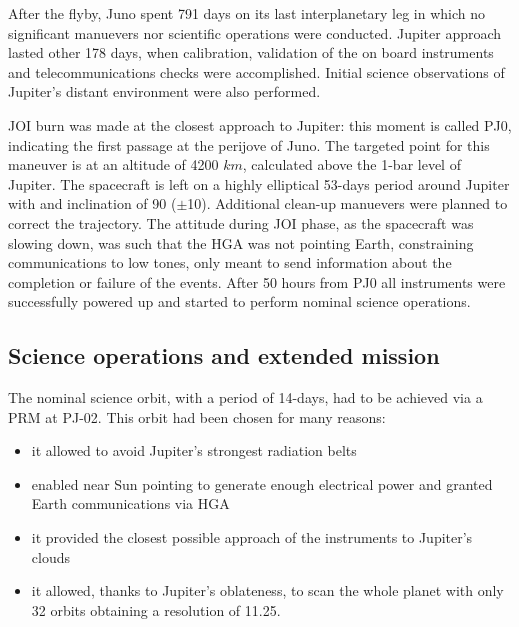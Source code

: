 After the flyby, Juno spent 791 days on its last interplanetary leg in which no significant manuevers nor scientific operations were conducted. Jupiter approach lasted other 178 days, when calibration, validation of the on board instruments and telecommunications checks were accomplished. Initial science observations of Jupiter's distant environment were also performed. 


JOI burn was made at the closest approach to Jupiter: this moment is called PJ0, indicating the first passage at the perijove of Juno. The targeted point for this maneuver is at an altitude of 4200 $km$, calculated above the 1-bar level of Jupiter. The spacecraft is left on a highly elliptical 53-days period around Jupiter with and inclination of 90\textdegree  \; ($\pm$10\textdegree). Additional clean-up manuevers were planned to correct the trajectory. The attitude during JOI phase, as the spacecraft was slowing down, was such that the HGA was not pointing Earth, constraining communications to low tones, only meant to send information about the completion or failure of the events. 
After 50 hours from PJ0 all instruments were successfully powered up and started to perform nominal science operations.

\subsection{Science operations and extended mission}
\label{sec: science ops}


The nominal science orbit, with a period of 14-days, had to be achieved via a PRM at PJ-02.  This orbit had been chosen for many reasons: 

\begin{itemize}
    \item it allowed to avoid Jupiter's strongest radiation belts
    \item enabled near Sun pointing to generate enough electrical power and granted Earth communications via HGA
    \item it provided the closest possible approach of the instruments to Jupiter's clouds 
    \item it allowed, thanks to Jupiter's oblateness, to scan the whole planet with only 32 orbits obtaining a resolution of 11.25\textdegree.
\end{itemize}

